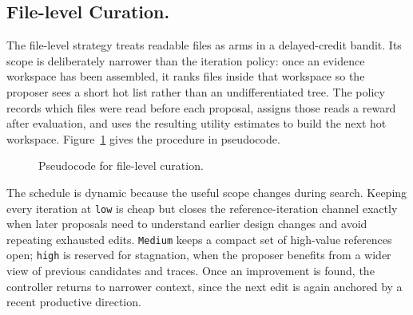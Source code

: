 \subsection{File-level Curation.}
\label{sec:bandit}
The file-level strategy treats readable files as arms in a delayed-credit
bandit. Its scope is deliberately narrower than the iteration policy: once an
evidence workspace has been assembled, it ranks files inside that workspace
so the proposer sees a short hot list rather than an undifferentiated tree.
The policy records which files were read before each proposal, assigns those
reads a reward after evaluation, and uses the resulting utility estimates to
build the next hot workspace. Figure~\ref{fig:file_bandit_pseudo} gives the
procedure in pseudocode.

\begin{figure}[t]
\centering
{}
\vspace{-4pt}
\caption{Pseudocode for file-level curation.}
\label{fig:file_bandit_pseudo}
\end{figure}

The schedule is dynamic because the useful scope changes during search.
Keeping every iteration at \texttt{low} is cheap but closes the
reference-iteration channel exactly when later proposals need to understand
earlier design changes and avoid repeating exhausted edits. \texttt{Medium}
keeps a compact set of high-value references open; \texttt{high} is reserved
for stagnation, when the proposer benefits from a wider view of previous
candidates and traces. Once an improvement is found, the controller returns
to narrower context, since the next edit is again anchored by a recent
productive direction.
